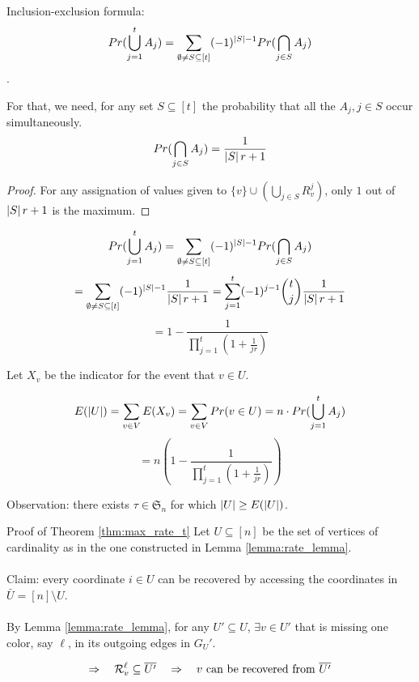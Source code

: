 \begin{frame}
    Inclusion-exclusion formula: 
    $$Pr(\bigcup_{j=1}^{t} A_j) = \sum_{\emptyset \neq S \subseteq [t]} (-1)^{\left\vert {S} \right\vert - 1} Pr( \bigcap_{j\in S} A_j )$$.
    
    For that, we need, for any set $S \subseteq [t]$ the probability that all the $A_j, j \in S$ occur simultaneously.
    $$
        Pr(\bigcap_{j\in S} A_j ) = \frac{1}{\left\vert {S} \right\vert r+1}
    $$
    
    \begin{proof}
        For any assignation of values given to $\{v\} \cup ( \bigcup_{j\in S} R_v^j)$, only $1$ out of $\left\vert {S} \right\vert r + 1$ is the maximum.
    \end{proof}
\end{frame}

\begin{frame}
    $$
        Pr(\bigcup_{j=1}^{t} A_j)
        = \sum_{\emptyset \neq S \subseteq [t]} (-1)^{\left\vert {S} \right\vert - 1} Pr( \bigcap_{j\in S} A_j )
    $$
    $$
        = \sum_{\emptyset \neq S \subseteq [t]} (-1)^{\left\vert {S} \right\vert - 1} \frac{1}{\left\vert {S} \right\vert r+1}
        = \sum_{j=1}^{t} (-1)^{j - 1} \binom{t}{j} \frac{1}{\left\vert {S} \right\vert r+1}
    $$
    $$
        = 1 - \frac{1}{ \prod_{j=1}^{t} \left(1 + \frac{1}{jr} \right) }
    $$
\end{frame}

\begin{frame}
    Let $X_v$ be the indicator for the event that $v \in U$.
    
    $$
        E(\left\vert {U} \right\vert)
        = \sum_{v \in V} E(X_v)
        = \sum_{v \in V} Pr(v \in U)
        = n \cdot Pr(\bigcup_{j=1}^{t} A_j)
    $$
    $$
        = n (1 - \frac{1}{ \prod_{j=1}^{t} \left(1 + \frac{1}{jr} \right) })
    $$
    
    Observation: there exists $\tau \in \mathfrak{S}_n$ for which $\left\vert {U} \right\vert \geq E(\left\vert {U} \right\vert)$.
\end{frame}

\begin{frame}{Proof of Theorem \ref{thm:max_rate_t}}
    Let $U \subseteq [n]$ be the set of vertices of cardinality as in the one constructed in Lemma \ref{lemma:rate_lemma}. \\~\\
    
    Claim: every coordinate $i\in U$ can be recovered by accessing the coordinates in $\bar{U} = [n] \setminus U$. \\~\\
    
    By Lemma \ref{lemma:rate_lemma}, for any $U' \subseteq U$, $\exists v\in U'$ that is missing one color, say $\ell$, in its outgoing edges in $G_U'$. 
    
    $$ \Rightarrow \quad \mathcal{R}_v^\ell \subseteq \overline{U'} \quad \Rightarrow \quad v \mbox{ can be recovered from } \overline{U'}$$ \\~\\
    
\end{frame}

